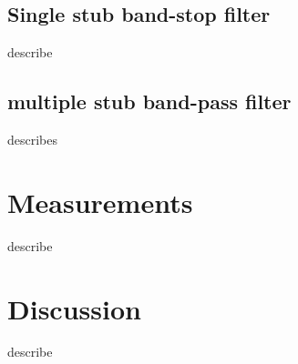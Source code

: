 \documentclass[letterpaper, 12pt]{article}
\begin{document}
\subsection{Single stub band-stop filter}
describe
\subsection{multiple stub band-pass filter}
describes
\section{Measurements}
describe
\section{Discussion}
describe
\end{document}
